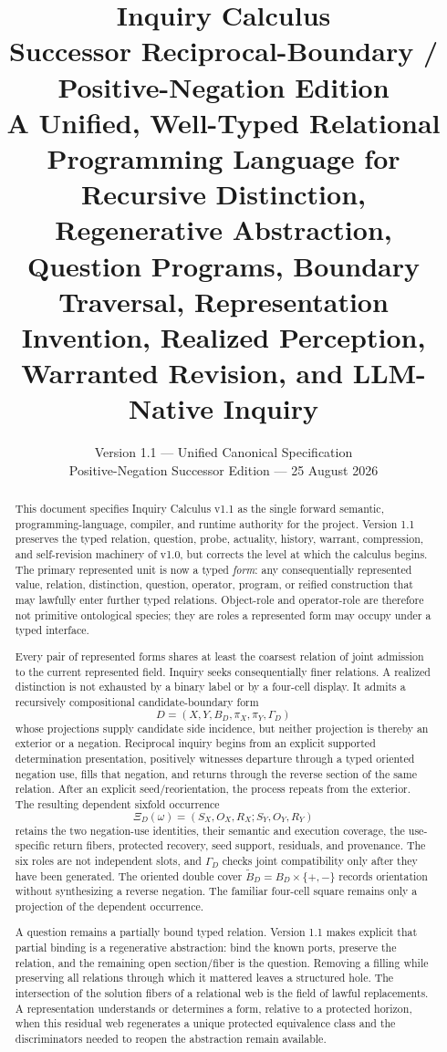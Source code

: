 \documentclass[11pt,oneside]{article}
\title{\textbf{Inquiry Calculus}\\
\large Successor Reciprocal-Boundary / Positive-Negation Edition\\
\normalsize A Unified, Well-Typed Relational Programming Language for Recursive Distinction, Regenerative Abstraction, Question Programs, Boundary Traversal, Representation Invention, Realized Perception, Warranted Revision, and LLM-Native Inquiry}
\author{}
\date{Version 1.1 --- Unified Canonical Specification\\Positive-Negation Successor Edition --- 25 August 2026}
\begin{document}
\maketitle

\begin{abstract}
This document specifies Inquiry Calculus v1.1 as the single forward semantic, programming-language, compiler, and runtime authority for the project.  Version 1.1 preserves the typed relation, question, probe, actuality, history, warrant, compression, and self-revision machinery of v1.0, but corrects the level at which the calculus begins.  The primary represented unit is now a typed \emph{form}: any consequentially represented value, relation, distinction, question, operator, program, or reified construction that may lawfully enter further typed relations.  Object-role and operator-role are therefore not primitive ontological species; they are roles a represented form may occupy under a typed interface.

Every pair of represented forms shares at least the coarsest relation of joint admission to the current represented field.  Inquiry seeks consequentially finer relations.  A realized distinction is not exhausted by a binary label or by a four-cell display.  It admits a recursively compositional candidate-boundary form
\[
D=(X,Y,B_D,\pi_X,\pi_Y,\Gamma_D)
\]
whose projections supply candidate side incidence, but neither projection is thereby an exterior or a negation.  Reciprocal inquiry begins from an explicit supported determination presentation, positively witnesses departure through a typed oriented negation use, fills that negation, and returns through the reverse section of the same relation.  After an explicit seed/reorientation, the process repeats from the exterior.  The resulting dependent sixfold occurrence
\[
\Xi_D(\omega)=(S_X,O_X,R_X;S_Y,O_Y,R_Y)
\]
retains the two negation-use identities, their semantic and execution coverage, the use-specific return fibers, protected recovery, seed support, residuals, and provenance.  The six roles are not independent slots, and \(\Gamma_D\) checks joint compatibility only after they have been generated.  The oriented double cover \(\widetilde B_D=B_D\times\{+,-\}\) records orientation without synthesizing a reverse negation.  The familiar four-cell square remains only a projection of the dependent occurrence.

A question remains a partially bound typed relation.  Version 1.1 makes explicit that partial binding is a regenerative abstraction: bind the known ports, preserve the relation, and the remaining open section/fiber is the question.  Removing a filling while preserving all relations through which it mattered leaves a structured hole.  The intersection of the solution fibers of a relational web is the field of lawful replacements.  A representation understands or determines a form, relative to a protected horizon, when this residual web regenerates a unique protected equivalence class and the discriminators needed to reopen the abstraction remain available.


\end{abstract}
\end{document}
